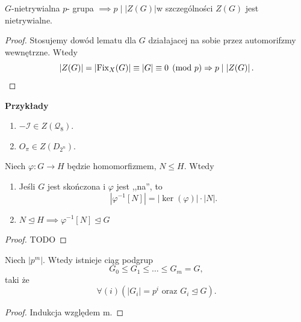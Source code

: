 \begin{theorem}
	$G$-nietrywialna $p$- grupa $\implies p\mid \left| Z(G) \right| $w szczególności $Z(G)$ jest nietrywialne. 
\end{theorem} 
\begin{proof}
	Stosujemy dowód lematu dla $G$ działajacej na sobie przez automorifzmy wewnętrzne. Wtedy
	\[
	\left| Z(G) \right| = \left| \operatorname{Fix}_{X}(G)  \right| \equiv \left| G \right|  \equiv 0 \pmod{p} \Rightarrow p\mid \left| Z(G) \right|  
	.\] 
\end{proof} 

\textbf{Przykłady}
\begin{enumerate}[label=\arabic*.]
	\item $-\mathcal{I}\in Z(\mathcal{Q}_{8}).$ 
	\item $O_{\pi}\in Z(D_{2^{n}}).$
\end{enumerate}
\begin{lemma}
	Niech $\varphi : G \to H$ będzie homomorfizmem, $N\le H$. Wtedy
	\begin{enumerate}[label=\arabic*.]
		\item Jeśli $G$ jest skończona i $\varphi $ jest ,,na'', to 
			\[
			\left| \varphi ^{-1} \left[ N \right]  \right| = \left| \ker(\varphi )  \right| \cdot \left| N \right| .\]
		\item $N\unlhd H \implies \varphi ^{-1}\left[ N \right] \unlhd G$
	\end{enumerate}
\end{lemma} 
\begin{proof}
	TODO
\end{proof} 
\begin{theorem}
	Niech $\left| p^{m} \right|.$ Wtedy istnieje ciąg podgrup
	\[
	G_0\le G_1\le \ldots\le G_{m} = G
	,\] 
	taki że
	\[
		\forall\left(i\right)\left( \left| G_{i} \right| = p^{i}\text{ oraz }G_{i}\unlhd G \right)  
	.\] 
\end{theorem} 
\begin{proof}
	Indukcja względem m.
\end{proof} 

